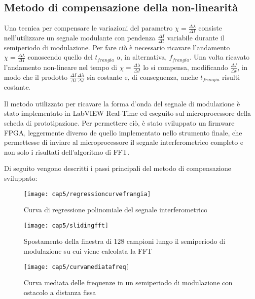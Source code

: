 \subsection{Metodo di compensazione della non-linearità}
\label{subsec:metodocomp}
Una tecnica per compensare le variazioni del parametro $\chi = \frac{\Delta \lambda}{\Delta I}$ consiste nell'utilizzare un segnale modulante con pendenza $\frac{\Delta I}{\Delta t}$ variabile durante il semiperiodo di modulazione. Per fare ciò è necessario ricavare l'andamento $\chi = \frac{\Delta \lambda}{\Delta I}$ conoscendo quello del $t_{frangia}$ o, in alternativa, $f_{frangia}$. Una volta ricavato l'andamento non-lineare nel tempo di $\chi = \frac{\Delta \lambda}{\Delta I}$ lo si compensa, modificando $\frac{\Delta I}{\Delta t}$, in modo che il prodotto $\frac{\Delta I}{\Delta t} \frac{\Delta \lambda}{\Delta I}$ sia costante e, di conseguenza, anche $t_{frangia}$ risulti costante.

Il metodo utilizzato per ricavare la forma d'onda del segnale di modulazione è stato implementato in LabVIEW Real-Time ed eseguito sul microprocessore della scheda di prototipazione. Per permettere ciò, è stato sviluppato un firmware FPGA, leggermente diverso de quello implementato nello strumento finale, che permettesse di inviare al microprocessore il segnale interferometrico completo e non solo i risultati dell'algoritmo di FFT.

Di seguito vengono descritti i passi principali del metodo di compensazione sviluppato:
\begin{figure}  
  \begin{center}
    \texttt{[image: cap5/regressioncurvefrangia]}
    \caption{Curva di regressione polinomiale del segnale interferometrico}
    \label{regressioncurvefrangia}
  \end{center}
\end{figure}

\begin{figure}  
  \begin{center}
    \texttt{[image: cap5/slidingfft]}
    \caption{Spostamento della finestra di 128 campioni lungo il semiperiodo di modulazione su cui viene calcolata la FFT}
    \label{slidingfft}
  \end{center}
\end{figure}

\begin{figure}  
  \begin{center}
    \texttt{[image: cap5/curvamediatafreq]}
    \caption{Curva mediata delle frequenze in un semiperiodo di modulazione con ostacolo a distanza fissa}
    \label{curvamediatafreq}
  \end{center}
\end{figure}

